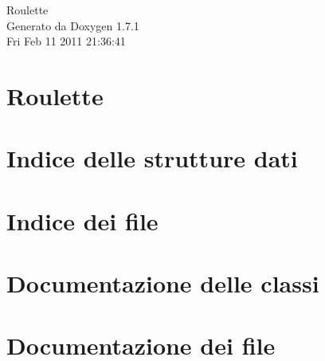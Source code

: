 \documentclass[a4paper]{book}
\begin{document}
\hypersetup{pageanchor=false}
\begin{titlepage}
\vspace*{7cm}
\begin{center}
{\Large Roulette }\\
\vspace*{1cm}
{\large Generato da Doxygen 1.7.1}\\
\vspace*{0.5cm}
{\small Fri Feb 11 2011 21:36:41}\\
\end{center}
\end{titlepage}
\clearemptydoublepage
{}
\tableofcontents
\clearemptydoublepage
{}
\hypersetup{pageanchor=true}
\chapter{Roulette}
\label{index}\hypertarget{index}{}
\chapter{Indice delle strutture dati}

\chapter{Indice dei file}

\chapter{Documentazione delle classi}










\chapter{Documentazione dei file}





\printindex
\end{document}
